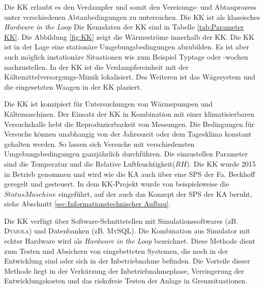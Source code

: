 Die KK erlaubt es den Verdampfer und somit den Vereisungs- und Abtauprozess unter verschiedenen Abtaubedingungen zu untersuchen. Die KK ist als klassisches \textit{Hardware in the Loop} Die Kenndaten der KK sind in Tabelle \ref{tab:Parameter KK}. Die Abbildung \ref{fig:KK} zeigt die Wärmeströme innerhalb der KK. Die KK ist in der Lage eine stationäre Umgebungsbedingungen abzubilden. Es ist aber auch möglich instationäre Situationen wie zum Beispiel Typtage oder -wochen nachzustellen. 
In der KK ist die Verdampfereinheit mit der Kältemittelversorgungs-Mimik lokalisiert. Des Weiteren ist das Wägesystem und die eingesetzten Waagen in der KK plaziert. 



Die KK ist konzipiert für  Untersuchungen von Wärmepumpen und Kältemaschinen. Der Einsatz der KK in Kombination mit einer klimatisierbaren Versuchshalle hebt die Reproduzierbarkeit von Messungen. Die Bedingungen für Versuche können unabhangig von der Jahreszeit oder dem Tagesklima konstant gehalten werden. So lassen sich Versuche mit verschiedensten Umgebungsbedingungen ganzjährlich durchführen.  Die einzustellen Parameter sind die Temperatur und die Relative Luftfeuchtigkeit($RH$). Die KK wurde 2015 in Betrieb genommen und wird wie die KA auch über eine SPS der Fa. Beckhoff geregelt und gesteuert. In dem KK-Projekt wurde von \textsc{\citeauthor{Nuerenberg2015}} beispielsweise die $Status Maschine$ eingeführt, auf der auch das Konzept der SPS der KA beruht, siehe Abschnitt \ref{sec:Informationstechnischer Aufbau}. 

Die KK verfügt über Software-Schnittstellen  mit Simulationssoftwares (zB. \textsc{Dymola}) und Datenbanken (zB. \textsc{MySQL}). Die Kombination aus Simulator mit echter Hardware wird als \textit{Hardware in the Loop} bezeichnet. Diese Methode dient zum Testen und Absichern von eingebetteten Systemen, die noch in der Entwicklung sind oder sich in der Inbetriebnahme befinden. Die Vorteile dieser Methode liegt in der Verkürzung der Inbetriebnahmephase, Verringerung der Entwicklungskosten und das riskofreie Testen der Anlage in Grenzsituationen. \citep{OPALRTT2014}


